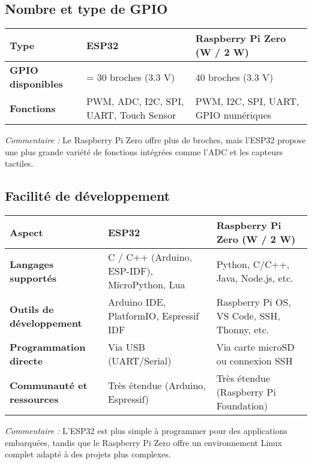 \documentclass{param}
\begin{document}
\subsection{Nombre et type de GPIO}
\begin{center}
\renewcommand{\arraystretch}{1.3}
\begin{tabularx}{0.95\textwidth}{|>{\bfseries}l|X|X|}
\hline
\textbf{Type} & \textbf{ESP32} & \textbf{Raspberry Pi Zero (W / 2 W)} \\
\hline
GPIO disponibles & = 30 broches (3.3 V) & 40 broches (3.3 V) \\
\hline
Fonctions & PWM, ADC, I2C, SPI, UART, Touch Sensor & PWM, I2C, SPI, UART, GPIO numériques \\
\hline
\end{tabularx}
\end{center}

\noindent\textit{Commentaire :}  
Le Raspberry Pi Zero offre plus de broches, mais l’ESP32 propose une plus grande variété de fonctions intégrées comme l’ADC et les capteurs tactiles.


\subsection{Facilité de développement}
\begin{center}
\renewcommand{\arraystretch}{1.3}
\begin{tabularx}{0.95\textwidth}{|>{\bfseries}l|X|X|}
\hline
\textbf{Aspect} & \textbf{ESP32} & \textbf{Raspberry Pi Zero (W / 2 W)} \\
\hline
Langages supportés & C / C++ (Arduino, ESP-IDF), MicroPython, Lua & Python, C/C++, Java, Node.js, etc. \\
\hline
Outils de développement & Arduino IDE, PlatformIO, Espressif IDF & Raspberry Pi OS, VS Code, SSH, Thonny, etc. \\
\hline
Programmation directe & Via USB (UART/Serial) & Via carte microSD ou connexion SSH \\
\hline
Communauté et ressources & Très étendue (Arduino, Espressif) & Très étendue (Raspberry Pi Foundation) \\
\hline
\end{tabularx}
\end{center}

\noindent\textit{Commentaire :}  
L’ESP32 est plus simple à programmer pour des applications embarquées, tandis que le Raspberry Pi Zero offre un environnement Linux complet adapté à des projets plus complexes.
\end{document}
